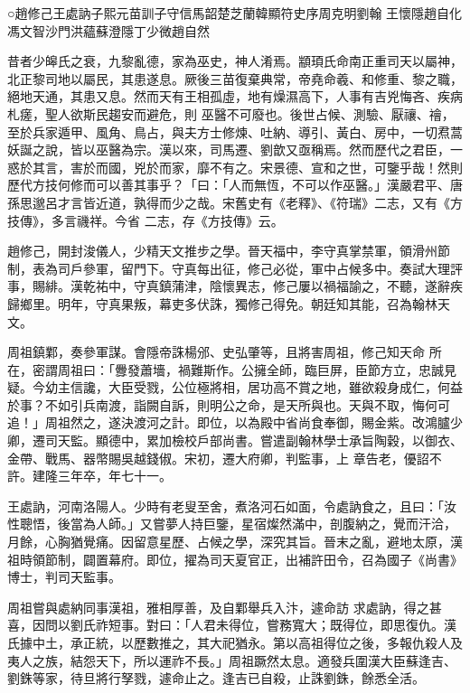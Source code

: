 
\begin{pinyinscope}

 ○趙修己王處訥子熙元苗訓子守信馬韶楚芝蘭韓顯符史序周克明劉翰
 王懷隱趙自化馮文智沙門洪蘊蘇澄隱丁少微趙自然



 昔者少皞氏之衰，九黎亂德，家為巫史，神人淆焉。顓頊氏命南正重司天以屬神，北正黎司地以屬民，其患遂息。厥後三苗復棄典常，帝堯命羲、和修重、黎之職，絕地天通，其患又息。然而天有王相孤虛，地有燥濕高下，人事有吉兇悔吝、疾病札瘥，聖人欲斯民趨安而避危，則
 巫醫不可廢也。後世占候、測驗、厭禳、禬，至於兵家遁甲、風角、鳥占，與夫方士修煉、吐納、導引、黃白、房中，一切焄蒿妖誕之說，皆以巫醫為宗。漢以來，司馬遷、劉歆又亟稱焉。然而歷代之君臣，一惑於其言，害於而國，兇於而家，靡不有之。宋景德、宣和之世，可鑒乎哉！然則歷代方技何修而可以善其事乎？「曰：「人而無恆，不可以作巫醫。」漢嚴君平、唐孫思邈呂才言皆近道，孰得而少之哉。宋舊史有《老釋》、《符瑞》二志，又有《方技傳》，多言禨祥。今省
 二志，存《方技傳》云。



 趙修己，開封浚儀人，少精天文推步之學。晉天福中，李守真掌禁軍，領滑州節制，表為司戶參軍，留門下。守真每出征，修己必從，軍中占候多中。奏試大理評事，賜緋。漢乾祐中，守真鎮蒲津，陰懷異志，修己屢以禍福諭之，不聽，遂辭疾歸鄉里。明年，守真果叛，幕吏多伏誅，獨修己得免。朝廷知其能，召為翰林天文。



 周祖鎮鄴，奏參軍謀。會隱帝誅楊邠、史弘肇等，且將害周祖，修己知天命
 所在，密謂周祖曰：「釁發蕭墻，禍難斯作。公擁全師，臨巨屏，臣節方立，忠誠見疑。今幼主信讒，大臣受戮，公位極將相，居功高不賞之地，雖欲殺身成仁，何益於事？不如引兵南渡，詣闕自訴，則明公之命，是天所與也。天與不取，悔何可追！」周祖然之，遂決渡河之計。即位，以為殿中省尚食奉御，賜金紫。改鴻臚少卿，遷司天監。顯德中，累加檢校戶部尚書。嘗遣副翰林學士承旨陶穀，以御衣、金帶、戰馬、器幣賜吳越錢俶。宋初，遷大府卿，判監事，上
 章告老，優詔不許。建隆三年卒，年七十一。



 王處訥，河南洛陽人。少時有老叟至舍，煮洛河石如面，令處訥食之，且曰：「汝性聰悟，後當為人師。」又嘗夢人持巨鑒，星宿燦然滿中，剖腹納之，覺而汗洽，月餘，心胸猶覺痛。因留意星歷、占候之學，深究其旨。晉末之亂，避地太原，漢祖時領節制，闢置幕府。即位，擢為司天夏官正，出補許田令，召為國子《尚書》博士，判司天監事。



 周祖嘗與處納同事漢祖，雅相厚善，及自鄴舉兵入汴，遽命訪
 求處訥，得之甚喜，因問以劉氏祚短事。對曰：「人君未得位，嘗務寬大；既得位，即思復仇。漢氏據中土，承正統，以歷數推之，其大祀猶永。第以高祖得位之後，多報仇殺人及夷人之族，結怨天下，所以運祚不長。」周祖蹶然太息。適發兵圍漢大臣蘇逢吉、劉銖等家，待旦將行孥戮，遽命止之。逢吉已自殺，止誅劉銖，餘悉全活。




\end{pinyinscope}
